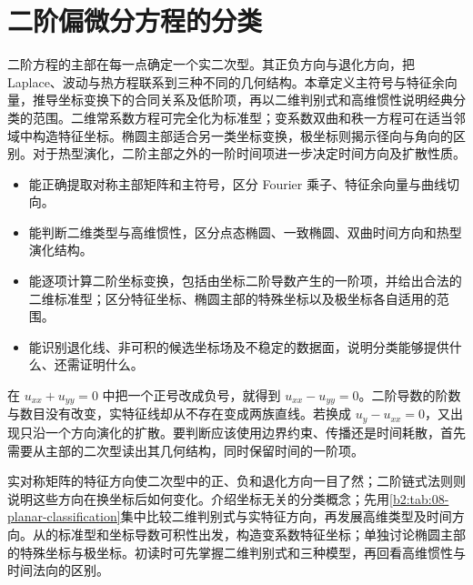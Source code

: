 \chapter{二阶偏微分方程的分类}
\label{b2:ch:08}
\begin{chapterabstract}
二阶方程的主部在每一点确定一个实二次型。其正负方向与退化方向，把 Laplace、波动与热方程联系到三种不同的几何结构。本章定义主符号与特征余向量，推导坐标变换下的合同关系及低阶项，再以二维判别式和高维惯性说明经典分类的范围。二维常系数方程可完全化为标准型；变系数双曲和秩一方程可在适当邻域中构造特征坐标。椭圆主部适合另一类坐标变换，极坐标则揭示径向与角向的区别。对于热型演化，二阶主部之外的一阶时间项进一步决定时间方向及扩散性质。
\end{chapterabstract}

\begin{learninggoals}
\begin{itemize}
\item\label{b2:item:08-goal-symbol}能正确提取对称主部矩阵和主符号，区分 Fourier 乘子、特征余向量与曲线切向。
\item\label{b2:item:08-goal-type}能判断二维类型与高维惯性，区分点态椭圆、一致椭圆、双曲时间方向和热型演化结构。
\item\label{b2:item:08-goal-coordinate}能逐项计算二阶坐标变换，包括由坐标二阶导数产生的一阶项，并给出合法的二维标准型；区分特征坐标、椭圆主部的特殊坐标以及极坐标各自适用的范围。
\item\label{b2:item:08-goal-limits}能识别退化线、非可积的候选坐标场及不稳定的数据面，说明分类能够提供什么、还需证明什么。
\end{itemize}
\end{learninggoals}

在 \(u_{xx}+u_{yy}=0\) 中把一个正号改成负号，就得到 \(u_{xx}-u_{yy}=0\)。二阶导数的阶数与数目没有改变，实特征线却从不存在变成两族直线。若换成 \(u_y-u_{xx}=0\)，又出现只沿一个方向演化的扩散。要判断应该使用边界约束、传播还是时间耗散，首先需要从主部的二次型读出其几何结构，同时保留时间的一阶项。

\ProseParagraphBreak

实对称矩阵的特征方向使二次型中的正、负和退化方向一目了然；二阶链式法则则说明这些方向在换坐标后如何变化。介绍坐标无关的分类概念；先用\cref{b2:tab:08-planar-classification}集中比较二维判别式与实特征方向，再发展高维类型及时间方向。从的标准型和坐标导数可积性出发，构造变系数特征坐标；单独讨论椭圆主部的特殊坐标与极坐标。初读时可先掌握二维判别式和三种模型，再回看高维惯性与时间法向的区别。

